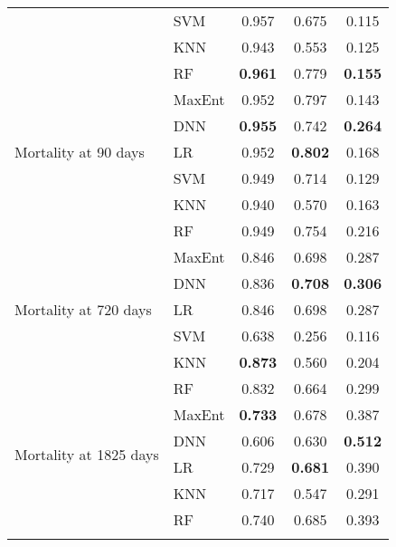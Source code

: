 \documentclass{article}
\begin{document}
\begin{table}[htbp]
\begin{tabular}{llccc}
                                                & SVM    & 0.957          & 0.675          & 0.115          \\
                                                & KNN    & 0.943          & 0.553          & 0.125          \\
                                                & RF     & \textbf{0.961} & 0.779          & \textbf{0.155} \\
        \hline
        \multirow{5}{*}{Mortality at 90 days}   & MaxEnt & 0.952          & 0.797          & 0.143          \\
                                                & DNN    & \textbf{0.955} & 0.742          & \textbf{0.264} \\
                                                & LR     & 0.952          & \textbf{0.802} & 0.168          \\
                                                & SVM    & 0.949          & 0.714          & 0.129          \\
                                                & KNN    & 0.940          & 0.570          & 0.163          \\
                                                & RF     & 0.949          & 0.754          & 0.216          \\
        \hline
        \multirow{5}{*}{Mortality at 720 days}  & MaxEnt & 0.846          & 0.698          & 0.287          \\
                                                & DNN    & 0.836          & \textbf{0.708} & \textbf{0.306} \\
                                                & LR     & 0.846          & 0.698          & 0.287          \\
                                                & SVM    & 0.638          & 0.256          & 0.116          \\
                                                & KNN    & \textbf{0.873} & 0.560          & 0.204          \\
                                                & RF     & 0.832          & 0.664          & 0.299          \\
        \hline
        \multirow{4}{*}{Mortality at 1825 days} & MaxEnt & \textbf{0.733} & 0.678          & 0.387          \\
                                                & DNN    & 0.606          & 0.630          & \textbf{0.512} \\
                                                & LR     & 0.729          & \textbf{0.681} & 0.390          \\
                                                & KNN    & 0.717          & 0.547          & 0.291          \\
                                                & RF     & 0.740       & 0.685      & 0.393       \\
        \hline
        \label{tab:final-model-hyperparameters}
    \end{tabular}
\end{table}
\end{document}
